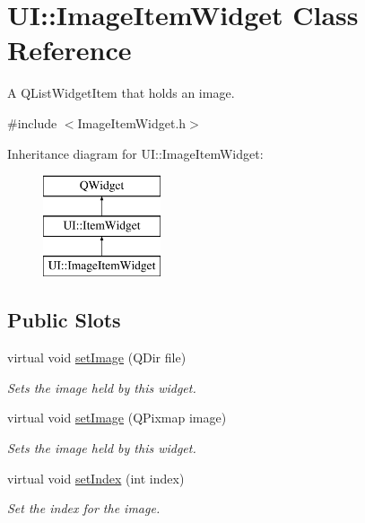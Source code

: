 \hypertarget{class_u_i_1_1_image_item_widget}{\section{U\-I\-:\-:Image\-Item\-Widget Class Reference}
\label{class_u_i_1_1_image_item_widget}
}


A {\ttfamily Q\-List\-Widget\-Item} that holds an image.  




{\ttfamily \#include $<$Image\-Item\-Widget.\-h$>$}

Inheritance diagram for U\-I\-:\-:Image\-Item\-Widget\-:\begin{figure}[H]
\begin{center}
\leavevmode
\includegraphics[height=3.000000cm]{class_u_i_1_1_image_item_widget}
\end{center}
\end{figure}
\subsection*{Public Slots}
\begin{DoxyCompactItemize}
\item 
virtual void \hyperlink{class_u_i_1_1_image_item_widget_a373c270957a733b466ae7dd07dfc68a2}{set\-Image} (Q\-Dir file)
\begin{DoxyCompactList}\small\item\em Sets the image held by this widget. \end{DoxyCompactList}\item 
virtual void \hyperlink{class_u_i_1_1_image_item_widget_a1cfb7ad6438db240b77ace9f1ca5dea0}{set\-Image} (Q\-Pixmap image)
\begin{DoxyCompactList}\small\item\em Sets the image held by this widget. \end{DoxyCompactList}\item 
virtual void \hyperlink{class_u_i_1_1_image_item_widget_a8b77375059e0acddd8fb786f205741f6}{set\-Index} (int index)
\begin{DoxyCompactList}\small\item\em Set the index for the image. \end{DoxyCompactList}\end{DoxyCompactItemize}
